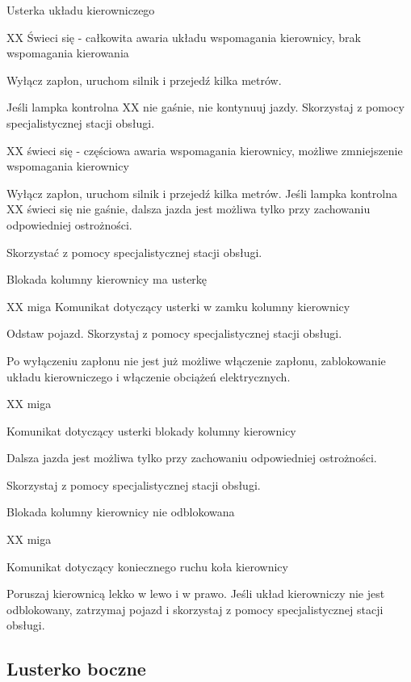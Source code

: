 Usterka układu kierowniczego

XX Świeci się - całkowita awaria układu wspomagania kierownicy, brak wspomagania kierowania

Wyłącz zapłon, uruchom silnik i przejedź kilka metrów.

Jeśli lampka kontrolna XX nie gaśnie, nie kontynuuj jazdy.
Skorzystaj z pomocy specjalistycznej stacji obsługi.

XX świeci się - częściowa awaria wspomagania kierownicy, możliwe zmniejszenie wspomagania kierownicy
\begin{itemizeArrow}
	\itemArrow Wyłącz zapłon, uruchom silnik i przejedź kilka metrów.
	\itemArrow Jeśli lampka kontrolna XX świeci się nie gaśnie, dalsza jazda jest możliwa tylko przy zachowaniu odpowiedniej ostrożności.
\end{itemizeArrow}
Skorzystać z pomocy specjalistycznej stacji obsługi.

Blokada kolumny kierownicy ma usterkę

XX miga
Komunikat dotyczący usterki w zamku kolumny kierownicy
\begin{itemizeArrow}
	\itemArrow Odstaw pojazd.
	\itemArrow Skorzystaj z pomocy specjalistycznej stacji obsługi.
\end{itemizeArrow}

Po wyłączeniu zapłonu nie jest już możliwe włączenie zapłonu, zablokowanie układu kierowniczego i włączenie obciążeń elektrycznych.

XX miga

Komunikat dotyczący usterki blokady kolumny kierownicy

\begin{itemizeArrow}
	\itemArrow Dalsza jazda jest możliwa tylko przy zachowaniu odpowiedniej ostrożności.
\end{itemizeArrow}
Skorzystaj z pomocy specjalistycznej stacji obsługi.

Blokada kolumny kierownicy nie odblokowana

XX miga

Komunikat dotyczący koniecznego ruchu koła kierownicy
\begin{itemizeArrow}
	\itemArrow Poruszaj kierownicą lekko w lewo i w prawo.
	\itemArrow Jeśli układ kierowniczy nie jest odblokowany, zatrzymaj pojazd i skorzystaj z pomocy specjalistycznej stacji obsługi.
\end{itemizeArrow}

\subsection{Lusterko boczne}

